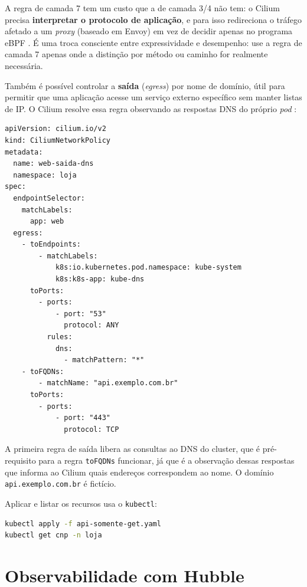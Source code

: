 A regra de camada 7 tem um custo que a de camada 3/4 não tem: o Cilium precisa
\textbf{interpretar o protocolo de aplicação}, e para isso redireciona o tráfego
afetado a um \textit{proxy} (baseado em Envoy) em vez de decidir apenas no programa
eBPF \cite{ciliumdocs}. É uma troca consciente entre expressividade e desempenho:
use a regra de camada 7 apenas onde a distinção por método ou caminho for realmente
necessária.

Também é possível controlar a \textbf{saída} (\textit{egress}) por nome de domínio,
útil para permitir que uma aplicação acesse um serviço externo específico sem
manter listas de IP. O Cilium resolve essa regra observando as respostas DNS do próprio
\textit{pod} \cite{ciliumdocs}:

\begin{lstlisting}[caption={Política de saída por nome de domínio (exemplo de manifesto).}, label=lst:cilium-fqdn]
apiVersion: cilium.io/v2
kind: CiliumNetworkPolicy
metadata:
  name: web-saida-dns
  namespace: loja
spec:
  endpointSelector:
    matchLabels:
      app: web
  egress:
    - toEndpoints:
        - matchLabels:
            k8s:io.kubernetes.pod.namespace: kube-system
            k8s:k8s-app: kube-dns
      toPorts:
        - ports:
            - port: "53"
              protocol: ANY
          rules:
            dns:
              - matchPattern: "*"
    - toFQDNs:
        - matchName: "api.exemplo.com.br"
      toPorts:
        - ports:
            - port: "443"
              protocol: TCP
\end{lstlisting}

A primeira regra de saída libera as consultas ao DNS do cluster, que é pré-requisito
para a regra \texttt{toFQDNs} funcionar, já que é a observação dessas respostas que
informa ao Cilium quais endereços correspondem ao nome. O domínio
\texttt{api.exemplo.com.br} é fictício.

Aplicar e listar os recursos usa o \texttt{kubectl}:

\begin{lstlisting}[language=bash, caption={Aplicação das políticas do Cilium (comando de cluster, não executado).}, label=lst:cilium-apply]
kubectl apply -f api-somente-get.yaml
kubectl get cnp -n loja
\end{lstlisting}

\section{Observabilidade com Hubble}

